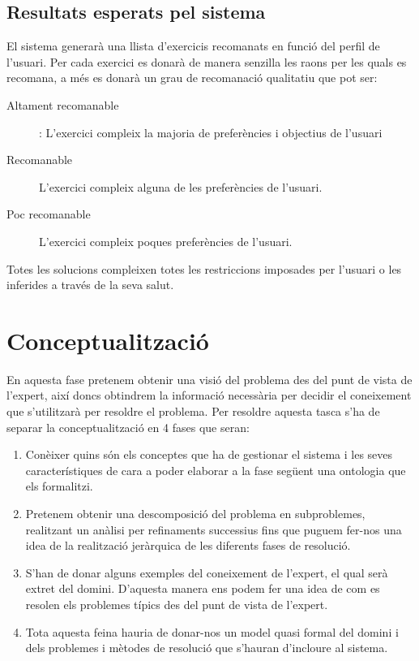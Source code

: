 \documentclass[a4paper, 12pt]{article}
\begin{document}
\subsection{Resultats esperats pel sistema}

El sistema generarà una llista d'exercicis recomanats en funció del perfil de l'usuari. Per cada exercici es donarà de manera senzilla les raons per les quals es recomana, a més es donarà un grau de recomanació qualitatiu que pot ser:

\begin{description}
	\item[Altament recomanable]: L'exercici compleix la majoria de preferències i objectius de l'usuari
	\item[Recomanable] L'exercici compleix alguna de les preferències de l'usuari.
	\item[Poc recomanable] L'exercici compleix poques preferències de l'usuari.
\end{description}

Totes les solucions compleixen totes les restriccions imposades per l'usuari o les inferides a través de la seva salut.

\section{Conceptualització}

En aquesta fase pretenem obtenir una visió del problema des del punt de vista de l'expert, així doncs obtindrem  la informació necessària per decidir el coneixement que s'utilitzarà per resoldre el problema. Per resoldre aquesta tasca s'ha de separar la conceptualització en 4 fases que seran:

\begin{enumerate}
	\item Conèixer quins són els conceptes que ha de gestionar el sistema i les seves característiques de cara a poder elaborar a la fase següent una ontologia que els formalitzi.
	\item Pretenem obtenir una descomposició del problema en subproblemes, realitzant un anàlisi per refinaments successius fins que puguem fer-nos una idea de la realització jeràrquica de les diferents fases de resolució.
	\item S'han de donar alguns exemples del coneixement de l'expert, el qual serà extret del domini. D'aquesta manera ens podem fer una idea de com es resolen els problemes típics des del punt de vista de l'expert.
	\item Tota aquesta feina hauria de donar-nos un model quasi formal del domini i dels problemes i mètodes de resolució que s'hauran d'incloure al sistema.
\end{enumerate}
\end{document}
